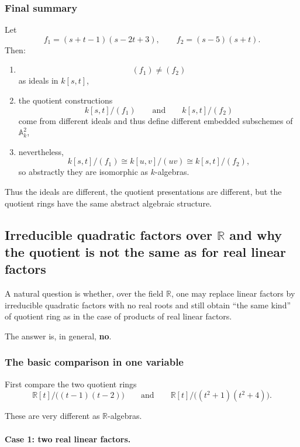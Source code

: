 \documentclass[12pt,a4paper]{article}
\theoremstyle{notespace}
\theoremstyle{definition}
\begin{document}
\subsubsection{Final summary}

Let
\[
f_1=(s+t-1)(s-2t+3),
\qquad
f_2=(s-5)(s+t).
\]
Then:

\begin{enumerate}
	\item
	\[
	(f_1)\neq (f_2)
	\]
	as ideals in \(k[s,t]\),
	
	\item the quotient constructions
	\[
	k[s,t]/(f_1)
	\qquad\text{and}\qquad
	k[s,t]/(f_2)
	\]
	come from different ideals and thus define different embedded subschemes of \(\mathbb{A}^2_k\),
	
	\item nevertheless,
	\[
	k[s,t]/(f_1)\cong k[u,v]/(uv)\cong k[s,t]/(f_2),
	\]
	so abstractly they are isomorphic as \(k\)-algebras.
\end{enumerate}

Thus the ideals are different, the quotient presentations are different, but the quotient rings have the same abstract algebraic structure.

\subsection{Irreducible quadratic factors over \(\mathbb{R}\) and why the quotient is not the same as for real linear factors}

A natural question is whether, over the field \(\mathbb{R}\), one may replace linear factors by irreducible quadratic factors with no real roots and still obtain ``the same kind'' of quotient ring as in the case of products of real linear factors.

The answer is, in general, \textbf{no}.

\subsubsection{The basic comparison in one variable}

First compare the two quotient rings
\[
\mathbb{R}[t]/\bigl((t-1)(t-2)\bigr)
\qquad\text{and}\qquad
\mathbb{R}[t]/\bigl((t^2+1)(t^2+4)\bigr).
\]

These are very different as \(\mathbb{R}\)-algebras.

\paragraph{Case 1: two real linear factors.}
\end{document}
